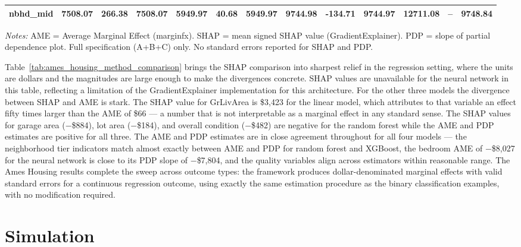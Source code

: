 \documentclass[12pt]{article}
\begin{document}
\begin{table}
\begin{threeparttable}
\begin{tabular}{lrrrrrrrrrrrr}
				nbhd\_mid & 7508.07 & 266.38 & 7508.07 & 5949.97 & 40.68 & 5949.97 & 9744.98 & -134.71 & 9744.97 & 12711.08 & -- & 9748.84 \\
				\bottomrule
			\end{tabular}
			\begin{tablenotes}
				\footnotesize
				\item \textit{Notes:} AME = Average Marginal Effect (marginfx). SHAP = mean signed SHAP value (GradientExplainer). PDP = slope of partial dependence plot. Full specification (A+B+C) only. No standard errors reported for SHAP and PDP.
			\end{tablenotes}
		\end{threeparttable}
	\end{table}
	
	Table~\ref{tab:ames_housing_method_comparison} brings the SHAP comparison into sharpest relief in the regression setting, where the units are dollars and the magnitudes are large enough to make the divergences concrete. SHAP values are unavailable for the neural network in this table, reflecting a limitation of the GradientExplainer implementation for this architecture. For the other three models the divergence between SHAP and AME is stark. The SHAP value for GrLivArea is \$3,423 for the linear model, which attributes to that variable an effect fifty times larger than the AME of \$66 --- a number that is not interpretable as a marginal effect in any standard sense. The SHAP values for garage area ($-$\$884), lot area ($-$\$184), and overall condition ($-$\$482) are negative for the random forest while the AME and PDP estimates are positive for all three. The AME and PDP estimates are in close agreement throughout for all four models --- the neighborhood tier indicators match almost exactly between AME and PDP for random forest and XGBoost, the bedroom AME of $-$\$8,027 for the neural network is close to its PDP slope of $-$\$7,804, and the quality variables align across estimators within reasonable range. The Ames Housing results complete the sweep across outcome types: the framework produces dollar-denominated marginal effects with valid standard errors for a continuous regression outcome, using exactly the same estimation procedure as the binary classification examples, with no modification required.
	
	\section{Simulation}
	
\end{document}
